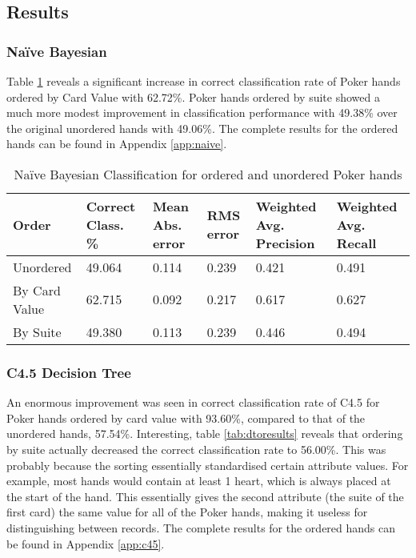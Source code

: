 \documentclass[10pt, a4paper]{article}
\begin{document}
\subsection*{Results}

\subsubsection*{Na\"ive Bayesian}

Table \ref{tab:nboresults} reveals a significant increase in correct classification rate of Poker hands ordered by Card Value with 62.72\%. Poker hands ordered by suite showed a much more modest improvement in classification performance with 49.38\% over the original unordered hands with 49.06\%. The complete results for the ordered hands can be found in Appendix \ref{app:naive}.

\begin{table}[htbp]
  \centering  
    \begin{tabular}{p{3cm}p{1.5cm}p{1.5cm}p{1.5cm}p{1.5cm}p{1.5cm}}
    \toprule
    \textbf{Order} & Correct Class. \% & Mean Abs. error & RMS error & Weighted Avg. Precision & Weighted Avg. Recall \\
    \midrule
    Unordered & 49.064 & 0.114 & 0.239 & 0.421 & 0.491 \\
    By Card Value & 62.715 & 0.092 & 0.217 & 0.617 & 0.627 \\
    By Suite & 49.380 & 0.113 & 0.239 & 0.446 & 0.494 \\
    \bottomrule
    \end{tabular}%
  \caption{Na\"ive Bayesian Classification for ordered and unordered Poker hands}
  \label{tab:nboresults}%
\end{table}%

\subsubsection*{C4.5 Decision Tree}

An enormous improvement was seen in correct classification rate of C4.5 for Poker hands ordered by card value with 93.60\%, compared to that of the unordered hands, 57.54\%. Interesting, table \ref{tab:dtoresults} reveals that ordering by suite actually decreased the correct classification rate to 56.00\%. This was probably because the sorting essentially standardised certain attribute values. For example, most hands would contain at least 1 heart, which is always placed at the start of the hand. This essentially gives the second attribute (the suite of the first card) the same value for all of the Poker hands, making it useless for distinguishing between records. The complete results for the ordered hands can be found in Appendix \ref{app:c45}.
\end{document}
